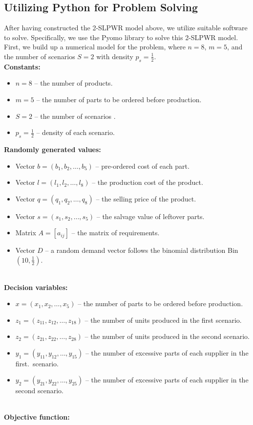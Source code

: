 \documentclass[a4paper]{article}
\begin{document}
		\subsection{Utilizing Python for Problem Solving}
		After having constructed the 2-SLPWR model above, we utilize suitable software to solve. Specifically, we use the Pyomo library to solve this 2-SLPWR model. First, we build up a numerical model for the problem, where \(n=8\), \(m=5\), and the number of scenarios \(S=2\) with density \(p_s=\frac{1}{2}\).\\
		\textbf{Constants:}
		\begin{itemize}
			\item $n=8$ -- the number of products.
			\item $m=5$ -- the number of parts to be ordered before production.
			\item $S=2$ -- the number of scenarios .
			\item $p_s=\frac{1}{2}$ -- density of each scenario.
		\end{itemize}
		\textbf{Randomly generated values:}
		\begin{itemize}
			\item Vector $b=(b_1, b_2, \ldots, b_5)$ -- pre-ordered cost of each part.
			\item Vector $l=(l_1, l_2, \ldots, l_8)$ -- the production cost of the product.
			\item Vector $q=(q_1, q_2, \ldots, q_8)$ -- the selling price of the product.
			\item Vector $s=(s_1, s_2, \ldots, s_5)$ -- the salvage value of leftover parts.
			\item Matrix $A=[a_{ij}]$ -- the matrix of requirements.
			\item Vector $D$ -- a random demand vector follows the binomial distribution Bin$(10, \frac{1}{2})$.
		\end{itemize}
		\\
		\textbf{Decision variables:}
		\begin{itemize}
			\item $x=(x_1, x_2, \ldots, x_5)$ -- the number of parts to be ordered before production.
			\item $z_1=(z_{11}, z_{12}, \ldots, z_{18})$ -- the number of units produced in the first scenario.
			\item $z_2=(z_{21}, z_{22}, \ldots, z_{28})$ -- the number of units produced in the second scenario.
			\item $y_1=(y_{11}, y_{12}, \ldots, y_{15})$ -- the number of excessive parts of each supplier in the first.\ scenario.
			\item $y_2=(y_{21}, y_{22}, \ldots, y_{25})$ -- the number of excessive parts of each supplier in the second scenario.
		\end{itemize}
		\\
		\textbf{Objective function:}
		
\end{document}
